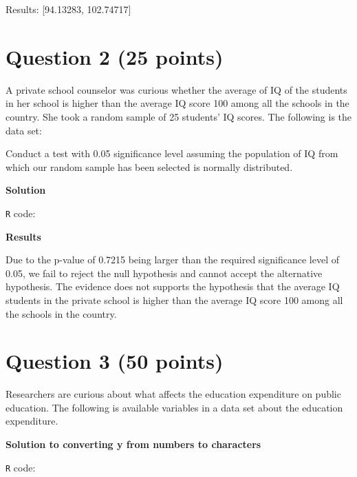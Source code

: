 \documentclass[12pt,letterpaper]{article}
\begin{document}
	Results: [94.13283, 102.74717]
		
	\vspace{1cm}
	\section*{Question 2 (25 points)}
	A private school counselor was curious  whether  the average of IQ of the students in her school is higher than the average IQ score 100 among all the schools in the country. She took a random sample of 25 students' IQ scores. The following is the data set:
	\vspace{.5cm}
	  
	\vspace{.5cm}
	
	\noindent Conduct a test with 0.05 significance level assuming the population of IQ from which our random sample has been selected is normally distributed. 
	\vspace{.25cm}
	
	\noindent\textbf{Solution}
	
	\texttt {R} code:
	
	
	
	\noindent\textbf{Results}
		
	Due to the p-value of 0.7215 being larger than the required significance level of 0.05, we fail to reject the null hypothesis and cannot accept the alternative hypothesis. The evidence does not supports the hypothesis that the average IQ students in the private school is higher than the average IQ score 100 among all the schools in the country.
	
	\vspace{1cm}
	\section*{Question 3 (50 points)}
	
	\noindent Researchers are curious about what affects the education expenditure on public education. The following is available variables in a data set about the education expenditure. \\
	\vspace{.25cm}
	
	\noindent\textbf{Solution to converting y from numbers to characters}
	
	\texttt {R} code:
	
	
	
\end{document}
